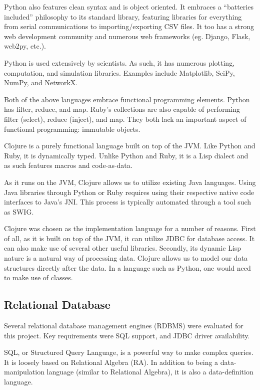 \documentclass[12pt,letterpaper,oneside]{report}
\theoremstyle{definition}
\begin{document}
				Python also features clean syntax and is object oriented.  It embraces a ``batteries included'' philosophy to its standard library, featuring libraries for everything from serial communications to importing/exporting CSV files.  It too has a strong web development community and numerous web frameworks (eg. Django, Flask, web2py, etc.).
				
				Python is used extensively by scientists.  As such, it has numerous plotting, computation, and simulation libraries.  Examples include Matplotlib, SciPy, NumPy, and NetworkX.
				
				Both of the above languages embrace functional programming elements.  Python has filter, reduce, and map.  Ruby's collections are also capable of performing filter (select), reduce (inject), and map.  They both lack an important aspect of functional programming:  immutable objects.
				
				Clojure is a purely functional language built on top of the JVM.  Like Python and Ruby, it is dynamically typed.  Unlike Python and Ruby, it is a Lisp dialect and as such features macros and code-as-data.
				
				As it runs on the JVM, Clojure allows us to utilize existing Java languages.  Using Java libraries through Python or Ruby requires using their respective native code interfaces to Java's JNI.  This process is typically automated through a tool such as SWIG.
				
				Clojure was chosen as the implementation language for a number of reasons.  First of all, as it is built on top of the JVM, it can utilize JDBC for database access.  It can also make use of several other useful libraries.  Secondly, its dynamic Lisp nature is a natural way of processing data.  Clojure allows us to model our data structures directly after the data.  In a language such as Python, one would need to make use of classes.
			
			\subsection{Relational Database}
				Several relational database management engines (RDBMS) were evaluated for this project.  Key requirements were SQL support, and JDBC driver availability.
				
				SQL, or Structured Query Language, is a powerful way to make complex queries.  It is loosely based on Relational Algebra (RA)\cite[p.~243]{dbsys-06}.  In addition to being a data-manipulation language (similar to Relational Algebra), it is also a data-definition language.
				
\end{document}
